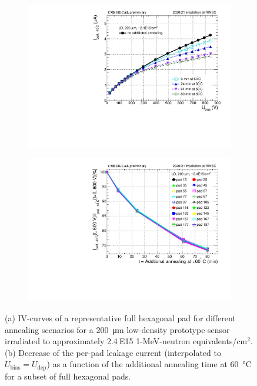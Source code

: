 \begin{figure}
	\captionsetup[subfigure]{aboveskip=-1pt,belowskip=-1pt}
	\centering
	\begin{subfigure}[b]{0.49\textwidth}
		\includegraphics[width=0.999\textwidth]{plots/annealing_iv/annealing_IV_ch24.pdf}
		\subcaption{
		}
		\label{plot:annealing_IV}
	\end{subfigure}
	\hfill
	\begin{subfigure}[b]{0.49\textwidth}
		\includegraphics[width=0.999\textwidth]{plots/annealing_iv/annealing_current.pdf}
		\subcaption{
		}
		\label{plot:annealing_current}
	\end{subfigure}    

	\caption{
		(a) IV-curves of a representative full hexagonal pad for different annealing scenarios for a \SI{200}{\micro\metre} low-density prototype sensor irradiated to approximately 2.4$~$E15 1-MeV-neutron equivalents/cm$^{2}$.
        (b) Decrease of the per-pad leakage current (interpolated to $U_\text{bias}=U_\text{dep}$) as a function of the additional annealing time at \SI{60}{\celsius} for a subset of full hexagonal pads.
	}
\end{figure}

